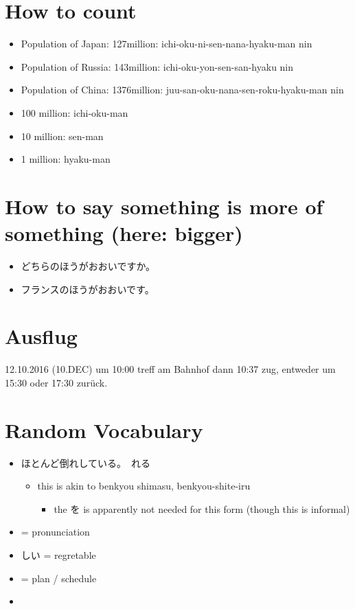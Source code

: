 \documentclass{article}
\begin{document}
\section{How to count}
\begin{itemize}%
\item Population of Japan: 127million: ichi-oku-ni-sen-nana-hyaku-man nin
\item Population of Russia: 143million: ichi-oku-yon-sen-san-hyaku nin
\item Population of China: 1376million: juu-san-oku-nana-sen-roku-hyaku-man nin
\item 100 million: ichi-oku-man
\item 10 million: sen-man
\item 1 million: hyaku-man
\end{itemize}
\section{How to say something is more of something (here: bigger)}
\begin{itemize}
\item どちらのほうがおおいですか。
\item フランスのほうがおおいです。
\end{itemize}
\section{Ausflug}
12.10.2016 (10.DEC) um 10:00 treff am Bahnhof dann 10:37 zug, entweder um 15:30 oder 17:30 zurück.
\section{Random Vocabulary}
\begin{itemize}
\item ほとんど倒れしている。　れる		
\begin{itemize}
\item this is akin to benkyou shimasu, benkyou-shite-iru
\begin{itemize}
\item the を is apparently not needed for this form (though this is informal)
\end{itemize}
\end{itemize}
\item {} = pronunciation
\item {}しい = regretable
\item {} = plan / schedule
\item 
\end{itemize}
\end{document}
